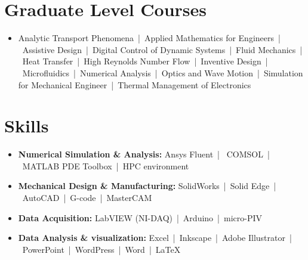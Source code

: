 \documentclass[letterpaper,11pt]{article}
\begin{document}
\ProjListEnd

\newcommand{\RCList}{\begin{itemize}[leftmargin=0in]} 
\newcommand{\RCListEnd}{\end{itemize}\vspace{-5pt}}

\newcommand{\RCBullet}[2]
{\item[]\small{{#2 \vspace{-7.5pt}}}}


\section{Graduate Level Courses}
\RCList
\RCBullet{}{Analytic Transport Phenomena~|~Applied Mathematics for Engineers~|~Assistive Design~|~Digital Control of Dynamic Systems~|~Fluid Mechanics~|~Heat Transfer~|~High Reynolds Number Flow~|~Inventive Design~|~Microfluidics~|~Numerical Analysis~|~Optics and Wave Motion~|~Simulation for Mechanical Engineer~|~Thermal Management of Electronics}

\RCListEnd

\newcommand{\SkillList}{\begin{itemize}[leftmargin=0.00in]}
\newcommand{\SkillListEnd}{\end{itemize}\vspace{-5pt}}

\newcommand{\SkillBullet}[2]
{\item[]\small{\textbf{#1}{#2 \vspace{-5pt}}}}

\section{Skills}
\SkillList    
    \SkillBullet{Numerical Simulation \& Analysis: }{Ansys Fluent~|~ COMSOL~|~MATLAB PDE Toolbox~|~HPC environment}
    \SkillBullet{Mechanical Design \& Manufacturing: }{SolidWorks~|~Solid Edge~|~AutoCAD~|~G-code~|~MasterCAM}
    \SkillBullet{Data Acquisition: }{LabVIEW (NI-DAQ)~|~Arduino~|~micro-PIV}
    \SkillBullet{Data Analysis \& visualization: }{Excel~|~Inkscape~|~Adobe Illustrator~|~PowerPoint~|~WordPress~|~Word~|~\LaTeX}
\SkillListEnd

\end{document}
